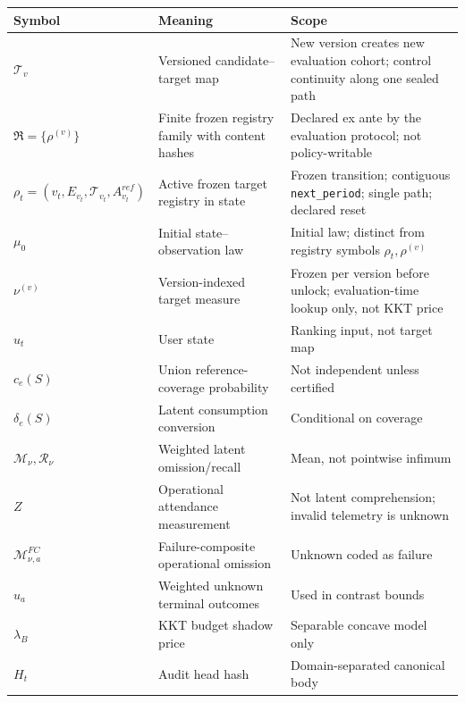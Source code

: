 \documentclass[
  11pt]{article}
\begin{document}
\begin{longtable}[]{@{}
  >{\raggedright\arraybackslash}p{}
  >{\raggedright\arraybackslash}p{}
  >{\raggedright\arraybackslash}p{}@{}}
\toprule\noalign{}
\begin{minipage}[b]{\linewidth}\raggedright
Symbol
\end{minipage} & \begin{minipage}[b]{\linewidth}\raggedright
Meaning
\end{minipage} & \begin{minipage}[b]{\linewidth}\raggedright
Scope
\end{minipage} \\
\midrule\noalign{}
\endhead
\bottomrule\noalign{}
\endlastfoot
\(\mathcal T_v\) & Versioned candidate--target map & New version creates
new evaluation cohort; control continuity along one sealed path \\
\(\mathfrak R=\{\rho^{(v)}\}\) & Finite frozen registry family with
content hashes & Declared ex ante by the evaluation protocol; not
policy-writable \\
\(\rho_t=(v_t,E_{v_t},\mathcal T_{v_t},A^{ref}_{v_t})\) & Active frozen
target registry in state & Frozen transition; contiguous
\texttt{next\_period}; single path; declared reset \\
\(\mu_0\) & Initial state--observation law & Initial law; distinct from
registry symbols \(\rho_t,\rho^{(v)}\) \\
\(\nu^{(v)}\) & Version-indexed target measure & Frozen per version
before unlock; evaluation-time lookup only, not KKT price \\
\(u_t\) & User state & Ranking input, not target map \\
\(c_e(S)\) & Union reference-coverage probability & Not independent
unless certified \\
\(\delta_e(S)\) & Latent consumption conversion & Conditional on
coverage \\
\(\mathcal M_\nu,\mathcal R_\nu\) & Weighted latent omission/recall &
Mean, not pointwise infimum \\
\(Z\) & Operational attendance measurement & Not latent comprehension;
invalid telemetry is unknown \\
\(\mathcal M^{FC}_{\nu,a}\) & Failure-composite operational omission &
Unknown coded as failure \\
\(u_a\) & Weighted unknown terminal outcomes & Used in contrast
bounds \\
\(\lambda_B\) & KKT budget shadow price & Separable concave model
only \\
\(H_t\) & Audit head hash & Domain-separated canonical body \\
\end{longtable}
\end{document}
